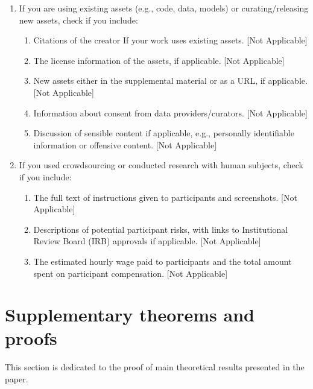 \documentclass[twoside]{article}
\theoremstyle{definition}
\begin{document}
\begin{enumerate}
 \item If you are using existing assets (e.g., code, data, models) or curating/releasing new assets, check if you include:
 \begin{enumerate}
   \item Citations of the creator If your work uses existing assets. [Not Applicable]
   \item The license information of the assets, if applicable. [Not Applicable]
   \item New assets either in the supplemental material or as a URL, if applicable. [Not Applicable]
   \item Information about consent from data providers/curators. [Not Applicable]
   \item Discussion of sensible content if applicable, e.g., personally identifiable information or offensive content. [Not Applicable]
 \end{enumerate}

 \item If you used crowdsourcing or conducted research with human subjects, check if you include:
 \begin{enumerate}
   \item The full text of instructions given to participants and screenshots. [Not Applicable]
   \item Descriptions of potential participant risks, with links to Institutional Review Board (IRB) approvals if applicable. [Not Applicable]
   \item The estimated hourly wage paid to participants and the total amount spent on participant compensation. [Not Applicable]
 \end{enumerate}

 \end{enumerate}

\appendix
\renewcommand{\thetable}{S.\arabic{table}}
\renewcommand{\theremark}{S.\arabic{remark}}
\renewcommand{\thefigure}{S.\arabic{figure}}
\renewcommand{\thetheorem}{S.\arabic{theorem}}
\renewcommand{\thecorollary}{S.\arabic{corollary}}
\renewcommand{\thecorollary}{S.\arabic{lemma}}



\section{Supplementary theorems and proofs}\label{sec:proofs}
This section is dedicated to the proof of main theoretical results presented in the paper. 
\end{document}
